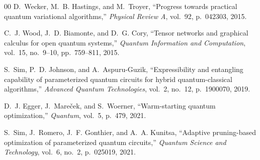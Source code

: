 \documentclass[conference]{IEEEtran}
\begin{document}
\begin{thebibliography}{00}
D.~Wecker, M.~B. Hastings, and M.~Troyer,
``Progress towards practical quantum variational algorithms,''
\textit{Physical Review A}, vol.~92, p.~042303, 2015.

C.~J. Wood, J.~D. Biamonte, and D.~G. Cory,
``Tensor networks and graphical calculus for open quantum systems,''
\textit{Quantum Information and Computation}, vol.~15, no.~9--10, pp.~759--811, 2015.

S.~Sim, P.~D. Johnson, and A.~Aspuru-Guzik,
``Expressibility and entangling capability of parameterized quantum circuits for hybrid quantum-classical algorithms,''
\textit{Advanced Quantum Technologies}, vol.~2, no.~12, p.~1900070, 2019.

D.~J. Egger, J.~Mare\v{c}ek, and S.~Woerner,
``Warm-starting quantum optimization,''
\textit{Quantum}, vol.~5, p.~479, 2021.

S.~Sim, J.~Romero, J.~F. Gonthier, and A.~A. Kunitsa,
``Adaptive pruning-based optimization of parameterized quantum circuits,''
\textit{Quantum Science and Technology}, vol.~6, no.~2, p.~025019, 2021.

\end{thebibliography}
\end{document}
